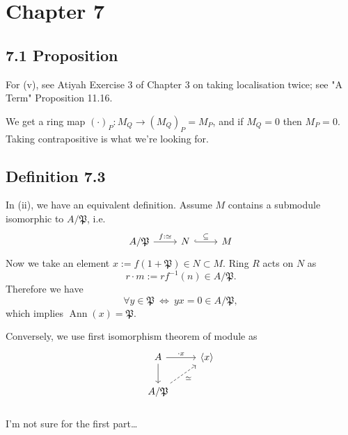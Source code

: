 \section{Chapter 7}

\subsection{7.1 Proposition}

For (v), see Atiyah \cite{atiyah1994introduction} Exercise 3 of Chapter 3 on taking localisation twice; see "A Term" \cite{altman} Proposition 11.16.

We get a ring map $(\cdot)_{P}:M_{Q}\to (M_Q)_P=M_P$, and if $M_Q=0$ then $M_P=0$. Taking contrapositive is what we're looking for.

\subsection{Definition 7.3}

In (ii), we have an equivalent definition. 
Assume $M$ contains a submodule isomorphic to $A/\mathfrak P$, i.e. 
\[\begin{tikzcd}
	{A/\mathfrak{P}} & N & M
	\arrow["\subseteq", hook, from=1-2, to=1-3]
	\arrow["{f:\simeq}", from=1-1, to=1-2]
\end{tikzcd}\]
Now we take an element $x:=f(1+\mathfrak P)\in N\subset M$. Ring $R$ acts on $N$ as 
$$r\cdot m:= rf^{-1}(n)\in A/\mathfrak P.$$
Therefore we have $$\forall y\in\mathfrak P ~\Leftrightarrow~ yx=0\in A/\mathfrak P,$$which implies $\operatorname{Ann}(x)=\mathfrak P$.

Conversely, we use first isomorphism theorem of module as 
\[\begin{tikzcd}
	A & {\langle x\rangle} \\
	{A/\mathfrak P}
	\arrow[from=1-1, to=2-1]
	\arrow["{\cdot x}", from=1-1, to=1-2]
	\arrow["\simeq"', dashed, from=2-1, to=1-2]
\end{tikzcd}\]

\subsubsection{}
I'm not sure for the first part\dots

